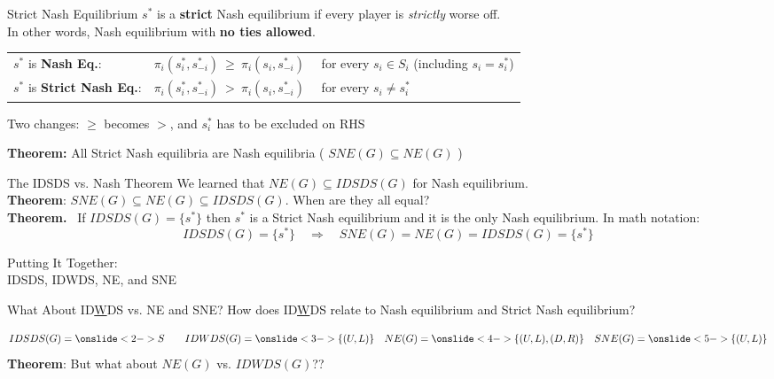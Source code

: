 \begin{frame}{Strict Nash Equilibrium}
$s^*$ is a \textbf{strict} Nash equilibrium if every player is \textit{strictly} worse off.\\
In other words, Nash equilibrium with \textbf{no ties allowed}.
\bsk
\centering
\begin{tabular}{ll}
$s^*$ is \textbf{Nash Eq.}: & $\pi_i(s_i^*,s_{-i}^*)\ \ge\ \pi_i(s_i,s_{-i}^*)$ \ \ for every $s_i\in S_i$ (including $s_i=s_i^*$) \\[0.18in]
$s^*$ is \textbf{Strict Nash Eq.}: & $\pi_i(s_i^*,s_{-i}^*)\ >\ \pi_i(s_i,s_{-i}^*)$ \ \ for every $s_i\ne s_i^*$ \\
\end{tabular}
\bsk
\raggedright
Two changes: $\ge$ becomes $>$, and $s_i^*$ has to be excluded on RHS
\bsk
\centering
\begin{matrixgame}[top={L, C, R}, left={U, M, D}]
\end{matrixgame}

\raggedright

\textbf{Theorem:} All Strict Nash equilibria are Nash equilibria ( $SNE(G)\subseteq NE(G)$ )
\end{frame}

\begin{frame}{The IDSDS vs. Nash Theorem}
We learned that $NE(G)\subseteq IDSDS(G)$ for Nash equilibrium.\\
\textbf{Theorem}: $SNE(G)\subseteq NE(G) \subseteq IDSDS(G)$.
\bsk
When are they all equal?\\
\textbf{Theorem.} \ If $IDSDS(G)=\{s^*\}$ then $s^*$ is a Strict Nash equilibrium and it is the only Nash equilibrium.
\bsk
In math notation:\\
$$
IDSDS(G) = \{s^*\}\quad \Longrightarrow \quad SNE(G)=NE(G)=IDSDS(G) =\{s^*\}
$$
\end{frame}

\begin{frame}[standout]
    Putting It Together:\\
    IDSDS, IDWDS, NE, and SNE
\end{frame}

\begin{frame}{What About ID\underline{W}DS vs. NE and SNE?}
How does ID\underline{W}DS relate to Nash equilibrium and Strict Nash equilibrium?
\begin{center}
    \begin{matrixgame}[top={L,R},left={U,D},player names={P1,P2}]
    \end{matrixgame}
\end{center}
$$
    IDSDS(G)=\onslide<2->{S}\quad\quad IDWDS(G)=\onslide<3->{\{(U,L)\}}\quad NE(G)=\onslide<4->{\{(U,L),(D,R)\}}\quad SNE(G)=\onslide<5->{\{(U,L)\}}
$$
\bsk
\textbf{Theorem}: 
\bsk
But what about $NE(G)$ vs. $IDWDS(G)$??
\end{frame}

